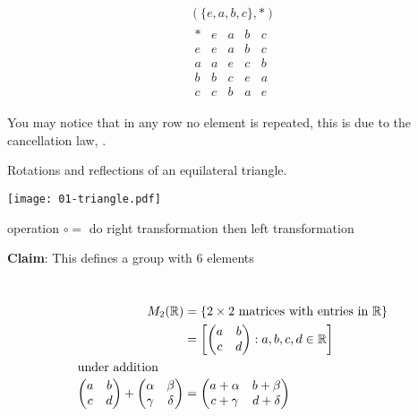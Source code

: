 \begin{example}
\protect\hypertarget{exm:nine}{}\label{exm:nine}

\begin{align*}
    (\{e, a, b, c\}, *) \\
    \begin{array}{c|cccc}
        * & e & a & b & c \\
        \hline
        e & e & a & b & c \\
        a & a & e & c & b \\
        b & b & c & e & a \\
        c & c & b & a & e
    \end{array} 
\end{align*}

You may notice that in any row no element is repeated, this is due to the cancellation law, .
\end{example}

\begin{example}
\protect\hypertarget{exm:triangle}{}\label{exm:triangle}
Rotations and reflections of an equilateral triangle.

{\centering
\texttt{[image: 01-triangle.pdf]}}

operation \(\circ =\) do right transformation then left transformation

\textbf{Claim}: This defines a group with 6 elements
\end{example}

\begin{example} ~\vspace*{-1.5\baselineskip}
\begin{align*}
    M_2(\mathbb{R}) &= \{ 2 \times 2 \text{ matrices with entries in } \mathbb{R} \} \\
    &= \left[ \begin{pmatrix} a & b \\ c & d \end{pmatrix} : a, b, c, d \in \mathbb{R} \right] \\
    \intertext{under addition}
    \begin{pmatrix}
    a & b \\
    c & d
    \end{pmatrix} + 
    \begin{pmatrix}
    \alpha & \beta \\
    \gamma & \delta
    \end{pmatrix} &=
    \begin{pmatrix}
    a + \alpha & b + \beta \\
    c + \gamma & d + \delta
    \end{pmatrix}
\end{align*}
\end{example}

